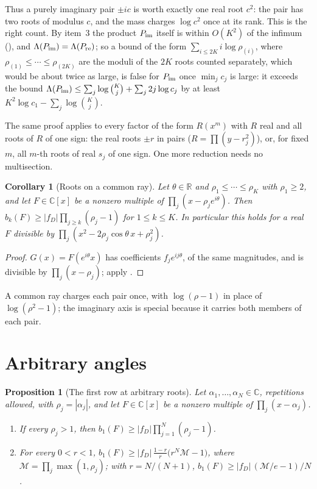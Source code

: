 \documentclass[11pt]{article}
\newtheorem{corollary}[theorem]{Corollary}
\newtheorem{proposition}[theorem]{Proposition}
\newcommand{\R}{\mathbb R}
\begin{document}
Thus a purely imaginary pair $\pm ic$ is worth exactly one real root $c^2$:
the pair has two roots of modulus $c$, and the mass charges $\log c^2$ once
at its rank.  This is the right count.  By item~3 the product
$P_{\rm im}$ itself is within $O(K^2)$ of the infimum
(\cite[Corollary~3.7]{coefficient-mass}), and $\Lambda(P_{\rm im})=\Lambda(P_{\rm re})$; so a
bound of the form $\sum_{i\le2K}i\log\rho_{(i)}$, where
$\rho_{(1)}\le\cdots\le\rho_{(2K)}$ are the moduli of the $2K$ roots
counted separately, which would be about twice as large, is false for
$P_{\rm im}$ once $\min_jc_j$ is large: it exceeds the bound
$\Lambda(P_{\rm im})\le\sum_j\log\binom Kj+\sum_j2j\log c_j$ by at least
$K^2\log c_1-\sum_j\log\binom Kj$.

The same proof applies to every factor of the form $R(x^m)$ with $R$ real
and all roots of $R$ of one sign: the real roots $\pm r$ in pairs
($R=\prod(y-r_j^2)$), or, for fixed $m$, all $m$-th roots of real $s_j$ of
one sign.  One
more reduction needs no multisection.

\begin{corollary}[Roots on a common ray]\label{cor:ray}
Let $\theta\in\R$ and $\rho_1\le\cdots\le\rho_K$ with $\rho_1\ge2$, and let
$F\in\mathbb C[x]$ be a nonzero multiple of $\prod_j(x-\rho_je^{i\theta})$.  Then
$b_k(F)\ge|f_D|\prod_{j\ge k}(\rho_j-1)$ for $1\le k\le K$.  In
particular this holds for a real $F$ divisible by
$\prod_j(x^2-2\rho_j\cos\theta\,x+\rho_j^2)$.
\end{corollary}

\begin{proof}
$G(x)=F(e^{i\theta}x)$ has coefficients $f_je^{ij\theta}$, of the same
magnitudes, and is divisible by $\prod_j(x-\rho_j)$; apply
\cite[Corollary~3.3]{coefficient-mass}.
\end{proof}

A common ray charges each pair once, with $\log(\rho-1)$ in place of
$\log(\rho^2-1)$; the imaginary axis is special because it carries both
members of each pair.


\section{Arbitrary angles}\label{sec:angles}

\begin{proposition}[The first row at arbitrary roots]\label{prop:rowone}
Let $\alpha_1,\ldots,\alpha_N\in\mathbb C$, repetitions allowed, with
$\rho_j=|\alpha_j|$, and let $F\in\mathbb C[x]$ be a nonzero multiple of
$\prod_j(x-\alpha_j)$.
\begin{enumerate}
\item If every $\rho_j>1$, then $b_1(F)\ge|f_D|\prod_{j=1}^N(\rho_j-1)$.
\item For every $0<r<1$,
$b_1(F)\ge|f_D|\,\frac{1-r}{r}\bigl(r^N\mathcal M-1\bigr)$, where
$\mathcal M=\prod_j\max(1,\rho_j)$; with $r=N/(N+1)$,
$b_1(F)\ge|f_D|\,(\mathcal M/e-1)/N$.
\end{enumerate}
\end{proposition}
\end{document}
